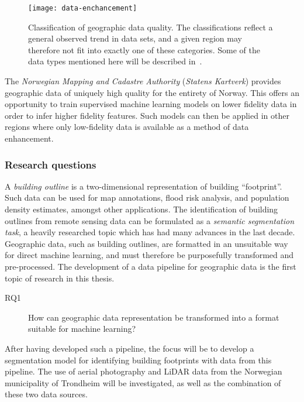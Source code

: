 \begin{figure}[htb]
  \texttt{[image: data-enchancement]}
  \caption{
    Classification of geographic data quality.
    The classifications reflect a general observed trend in data sets, and a given region may therefore not fit into exactly one of these categories.
    Some of the data types mentioned here will be described in~.
  }%
  \label{fig:data-enchancement}
\end{figure}

The \textit{Norwegian Mapping and Cadastre Authority} (\textit{Statens Kartverk}) provides geographic data of uniquely high quality for the entirety of Norway.
This offers an opportunity to train supervised machine learning models on lower fidelity data in order to infer higher fidelity features.
Such models can then be applied in other regions where only low-fidelity data is available as a method of data enhancement.

\subsubsection*{Research questions}

A \textit{building outline} is a two-dimensional representation of building \enquote{footprint}.
Such data can be used for map annotations, flood risk analysis, and population density estimates, amongst other applications.
The identification of building outlines from remote sensing data can be formulated as a \textit{semantic segmentation task}, a heavily researched topic which has had many advances in the last decade.
Geographic data, such as building outlines, are formatted in an unsuitable way for direct machine learning, and must therefore be purposefully transformed and pre-processed.
The development of a data pipeline for geographic data is the first topic of research in this thesis.

\begin{description}
  \item[RQ1] How can geographic data representation be transformed into a format suitable for machine learning?
\end{description}

After having developed such a pipeline, the focus will be to develop a segmentation model for identifying building footprints with data from this pipeline.
The use of aerial photography and LiDAR data from the Norwegian municipality of Trondheim will be investigated, as well as the combination of these two data sources.

